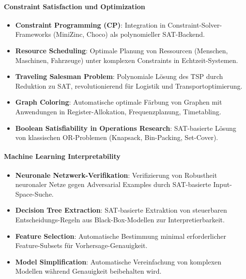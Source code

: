 ﻿\documentclass[a4paper,12pt]{article}
\theoremstyle{definition}
\begin{document}
\paragraph{Constraint Satisfaction und Optimization}

\begin{itemize}
	\item \textbf{Constraint Programming (CP)}: Integration in Constraint-Solver-Frameworks (MiniZinc, Choco) als polynomieller SAT-Backend.
	
	\item \textbf{Resource Scheduling}: Optimale Planung von Ressourcen (Menschen, Maschinen, Fahrzeuge) unter komplexen Constraints in Echtzeit-Systemen.
	
	\item \textbf{Traveling Salesman Problem}: Polynomiale Lösung des TSP durch Reduktion zu SAT, revolutionierend für Logistik und Transportoptimierung.
	
	\item \textbf{Graph Coloring}: Automatische optimale Färbung von Graphen mit Anwendungen in Register-Allokation, Frequenzplanung, Timetabling.
	
	\item \textbf{Boolean Satisfiability in Operations Research}: SAT-basierte Lösung von klassischen OR-Problemen (Knapsack, Bin-Packing, Set-Cover).
\end{itemize}

\paragraph{Machine Learning Interpretability}

\begin{itemize}
	\item \textbf{Neuronale Netzwerk-Verifikation}: Verifizierung von Robustheit neuronaler Netze gegen Adversarial Examples durch SAT-basierte Input-Space-Suche.
	
	\item \textbf{Decision Tree Extraction}: SAT-basierte Extraktion von steuerbaren Entscheidungs-Regeln aus Black-Box-Modellen zur Interpretierbarkeit.
	
	\item \textbf{Feature Selection}: Automatische Bestimmung minimal erforderlicher Feature-Subsets für Vorhersage-Genauigkeit.
	
	\item \textbf{Model Simplification}: Automatische Vereinfachung von komplexen Modellen während Genauigkeit beibehalten wird.
\end{itemize}
\end{document}
